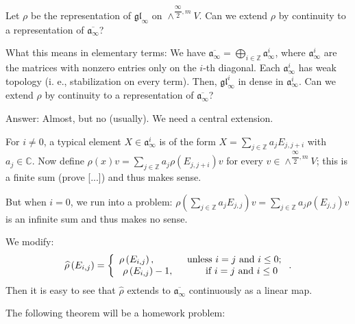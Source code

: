 \documentclass
[numbers=enddot,12pt,final,onecolumn,german,notitlepage]{scrartcl}%
\theoremstyle{definition}
\begin{document}
Let $\rho$ be the representation of $\mathfrak{gl}_{\infty}$ on $\wedge
^{\dfrac{\infty}{2},m}V$. Can we extend $\rho$ by continuity to a
representation of $\overline{\mathfrak{a}_{\infty}}$?

What this means in elementary terms: We have $\overline{\mathfrak{a}_{\infty}%
}=\bigoplus\limits_{i\in\mathbb{Z}}\mathfrak{a}_{\infty}^{i}$, where
$\mathfrak{a}_{\infty}^{i}$ are the matrices with nonzero entries only on the
$i$-th diagonal. Each $\mathfrak{a}_{\infty}^{i}$ has weak topology (i. e.,
stabilization on every term). Then, $\mathfrak{gl}_{\infty}^{i}$ in dense in
$\mathfrak{a}_{\infty}^{i}$. Can we extend $\rho$ by continuity to a
representation of $\overline{\mathfrak{a}_{\infty}}$?

Answer: Almost, but no (usually). We need a central extension.

For $i\neq0$, a typical element $X\in\mathfrak{a}_{\infty}^{i}$ is of the form
$X=\sum\limits_{j\in\mathbb{Z}}a_{j}E_{j,j+i}$ with $a_{j}\in\mathbb{C}$. Now
define $\rho\left(  x\right)  v=\sum\limits_{j\in\mathbb{Z}}a_{j}\rho\left(
E_{j,j+i}\right)  v$ for every $v\in\wedge^{\dfrac{\infty}{2},m}V$; this is a
finite sum (prove [...]) and thus makes sense.

But when $i=0$, we run into a problem: $\rho\left(  \sum\limits_{j\in
\mathbb{Z}}a_{j}E_{j,j}\right)  v=\sum\limits_{j\in\mathbb{Z}}a_{j}\rho\left(
E_{j,j}\right)  v$ is an infinite sum and thus makes no sense.

We modify:%
\[
\widehat{\rho}\left(  E_{i,j}\right)  =\left\{
\begin{array}
[c]{c}%
\rho\left(  E_{i,j}\right)  ,\ \ \ \ \ \ \ \ \ \ \text{unless }i=j\text{ and
}i\leq0;\\
\rho\left(  E_{i,j}\right)  -1,\ \ \ \ \ \ \ \ \ \ \text{if }i=j\text{ and
}i\leq0
\end{array}
\right.  .
\]
Then it is easy to see that $\widehat{\rho}$ extends to $\overline
{\mathfrak{a}_{\infty}}$ continuously as a linear map.

The following theorem will be a homework problem:
\end{document}
